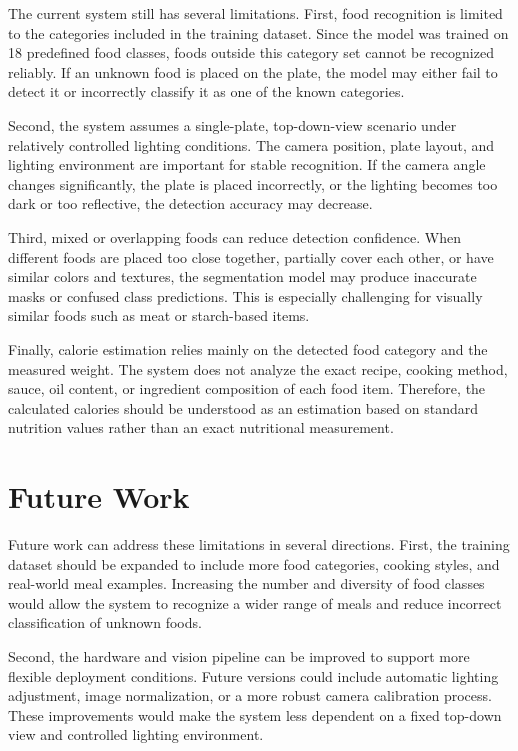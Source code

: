 \documentclass[11pt,a4paper]{article}
\begin{document}
The current system still has several limitations. First, food recognition is limited to the categories included in the training dataset. Since the model was trained on 18 predefined food classes, foods outside this category set cannot be recognized reliably. If an unknown food is placed on the plate, the model may either fail to detect it or incorrectly classify it as one of the known categories.

Second, the system assumes a single-plate, top-down-view scenario under relatively controlled lighting conditions. The camera position, plate layout, and lighting environment are important for stable recognition. If the camera angle changes significantly, the plate is placed incorrectly, or the lighting becomes too dark or too reflective, the detection accuracy may decrease.

Third, mixed or overlapping foods can reduce detection confidence. When different foods are placed too close together, partially cover each other, or have similar colors and textures, the segmentation model may produce inaccurate masks or confused class predictions. This is especially challenging for visually similar foods such as meat or starch-based items.

Finally, calorie estimation relies mainly on the detected food category and the measured weight. The system does not analyze the exact recipe, cooking method, sauce, oil content, or ingredient composition of each food item. Therefore, the calculated calories should be understood as an estimation based on standard nutrition values rather than an exact nutritional measurement.

\section{Future Work}

Future work can address these limitations in several directions. First, the training dataset should be expanded to include more food categories, cooking styles, and real-world meal examples. Increasing the number and diversity of food classes would allow the system to recognize a wider range of meals and reduce incorrect classification of unknown foods.

Second, the hardware and vision pipeline can be improved to support more flexible deployment conditions. Future versions could include automatic lighting adjustment, image normalization, or a more robust camera calibration process. These improvements would make the system less dependent on a fixed top-down view and controlled lighting environment.
\end{document}
